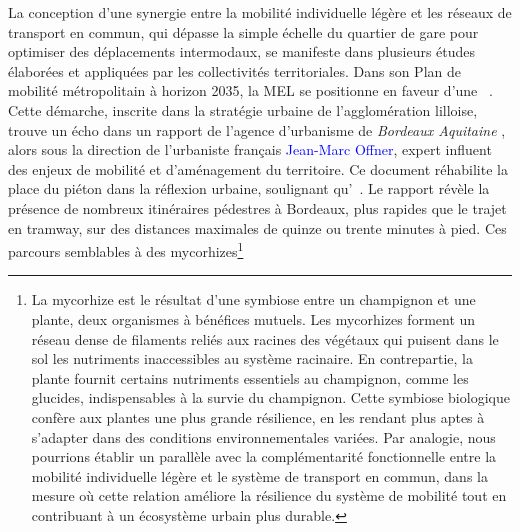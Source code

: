 \begin{refsegment}
La conception d'une synergie entre la mobilité individuelle légère et les réseaux de transport en commun, qui dépasse la simple échelle du quartier de gare pour optimiser des déplacements intermodaux, se manifeste dans plusieurs études élaborées et appliquées par les collectivités territoriales. Dans son Plan de mobilité métropolitain à horizon 2035, la \acrshort{MEL} se positionne en faveur d'une ~\textcolor{blue}{\autocite[328]{conseil_de_developpement_de_la_mel_plan_2022}}. Cette démarche, inscrite dans la stratégie urbaine de l'agglomération lilloise, trouve un écho dans un rapport de l'agence d'urbanisme de \textsl{Bordeaux Aquitaine} \textcolor{blue}{\textcite{aurba_itineraires_2017}}, alors sous la direction de l'urbaniste français \textcolor{blue}{Jean-Marc Offner}, expert influent des enjeux de mobilité et d'aménagement du territoire. Ce document réhabilite la place du piéton dans la réflexion urbaine, soulignant qu'~\textcolor{blue}{\autocite[3, 14, 24]{aurba_itineraires_2017}}. Le rapport révèle la présence de nombreux itinéraires pédestres à Bordeaux, plus rapides que le trajet en tramway, sur des distances maximales de quinze ou trente minutes à pied. Ces parcours semblables à des mycorhizes\footnote{
La mycorhize est le résultat d'une symbiose entre un champignon et une plante, deux organismes à bénéfices mutuels. Les mycorhizes forment un réseau dense de filaments reliés aux racines des végétaux qui puisent dans le sol les nutriments inaccessibles au système racinaire. En contrepartie, la plante fournit certains nutriments essentiels au champignon, comme les glucides, indispensables à la survie du champignon. Cette symbiose biologique confère aux plantes une plus grande résilience, en les rendant plus aptes à s'adapter dans des conditions environnementales variées. Par analogie, nous pourrions établir un parallèle avec la complémentarité fonctionnelle entre la mobilité individuelle légère et le système de transport en commun, dans la mesure où cette relation améliore la résilience du système de mobilité tout en contribuant à un écosystème urbain plus \gls{durable}.
}
\end{refsegment}
